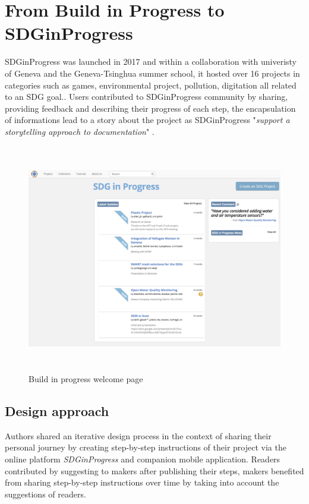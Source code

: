 \section{From Build in Progress to SDGinProgress}

SDGinProgress was launched in 2017 and within a collaboration with univeristy of Geneva and the Geneva-Tsinghua summer school, it hosted over 16 projects in categories such as games, environmental project, pollution, digitation all related to an SDG goal.. Users contributed to SDGinProgress community by sharing, providing feedback and describing their progress of each step, the encapsulation of informations lead to a story about the project as SDGinProgress "\textit{support a storytelling approach to documentation}" \cite{tseng2016making}.
\begin{figure}[ht!]
	\centering
	\includegraphics[width=15cm, height=10cm]{./images/img-sdginprogress.png}
	\caption{Build in progress welcome page}
	\label{img-sdginprogress}
\end{figure}

\subsection{Design approach}
Authors shared an iterative design process in the context of sharing their personal journey by creating step-by-step instructions of their project via the online platform \textit{SDGinProgress} and companion mobile application. Readers contributed by suggesting to makers after publishing their steps, makers benefited from sharing step-by-step instructions over time by taking into account the suggestions of readers.

